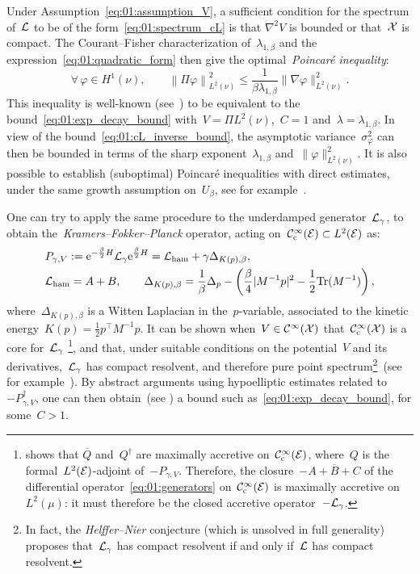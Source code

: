Under Assumption~\eqref{eq:01:assumption_V}, a sufficient condition for the spectrum of~$\mathcal{L}$ to be of the form~\eqref{eq:01:spectrum_cL} is that $\nabla^2 V$ is bounded or that~$\mathcal{X}$ is compact. The Courant--Fisher characterization of~$\lambda_{1,\beta}$ and the expression~\eqref{eq:01:quadratic_form} then give the optimal~\textit{Poincar\'e inequality}:
\begin{equation}
    \label{eq:01:poincare_inequality}
    \forall\,\varphi\in H^1(\nu),\qquad\left\|\Pi\varphi\right\|^2_{L^2(\nu)}\leq \frac1{\beta \lambda_{1,\beta}}\|\nabla\varphi\|^2_{L^2(\nu)}.
\end{equation}  
This inequality is well-known (see~\cite[Proposition 2.3]{LS16}) to be equivalent to the bound~\eqref{eq:01:exp_decay_bound} with~$V=\Pi L^2(\nu)$,~$C=1$ and~$\lambda = \lambda_{1,\beta}$.
In view of the bound~\eqref{eq:01:cL_inverse_bound}, the asymptotic variance~$\sigma_\varphi^2$ can then be bounded in terms of the sharp exponent~$\lambda_{1,\beta}$ and~$\|\varphi\|^2_{L^2(\nu)}$.
It is also possible to establish (suboptimal) Poincar\'e inequalities with direct estimates, under the same growth assumption on~$U_\beta$, see for example~\cite[Theorem A.1]{V06}.

One can try to apply the same procedure to the underdamped generator~$\mathcal{L}_\gamma$, to obtain the~\textit{Kramers--Fokker--Planck} operator, acting on~$\mathcal{C}^\infty_{\mathrm{c}}(\mathcal{E})\subset L^2(\mathcal{E})$ as:
\begin{equation}
    \label{eq:01:kfp}
    \begin{split}
    &P_{\gamma,V}:=\mathrm{e}^{-\frac{\beta}2 H}\mathcal{L}_\gamma\mathrm{e}^{\frac{\beta}2 H} = \mathcal{L}_{\mathrm{ham}} + \gamma\Delta_{K(p),\beta},\\
    &\mathcal{L}_{\mathrm{ham}}=A+B,\qquad\Delta_{K(p),\beta} = \frac1\beta\Delta_p -\left(\frac\beta{4}|M^{-1}p|^2 -\frac12 \mathrm{Tr}(M^{-1})\right),
    \end{split}
\end{equation}
where~$\Delta_{K(p),\beta}$ is a Witten Laplacian in the~$p$-variable, associated to the kinetic energy~$K(p)=\frac12 p^\top M^{-1}p$.
It can be shown when~$V\in \mathcal C^\infty(\mathcal{X})$ that~$\mathcal{C}^\infty_{\mathrm{c}}(\mathcal{X})$ is a core for~$\mathcal{L}_\gamma$
\footnote{\cite[Proposition 5.5]{NH05} shows that $\overline{Q}$ and~$Q^\dagger$ are maximally accretive on~$\mathcal{C}^\infty_{\mathrm{c}}(\mathcal{E})$, where~$Q$ is the formal~$L^2(\mathcal{E})$-adjoint of~$-P_{\gamma,V}$. Therefore, the closure~$-\overline{A+B+C}$ of the differential operator~\eqref{eq:01:generators} on~$\mathcal{C}^\infty_{\mathrm{c}}(\mathcal{E})$ is maximally accretive on~$L^2(\mu)$: it must therefore be the closed accretive operator~$-\mathcal{L}_\gamma$.},
and that, under suitable conditions on the potential~$V$ and its derivatives,~$\mathcal{L}_\gamma$ has compact resolvent, and therefore pure point spectrum\footnote{In fact, the \textit{Helffer--Nier} conjecture (which is unsolved in full generality) proposes that~$\mathcal{L}_{\gamma}$ has compact resolvent if and only if~$\mathcal{L}$ has compact resolvent.}~(see for example~\cite[Corollary 5.10]{NH05}).
By abstract arguments using hypoelliptic estimates related to~$-P_{\gamma,V}^\dagger$, one can then obtain~(see \cite[Theorem 6.4]{NH05}) a bound such as~\eqref{eq:01:exp_decay_bound}, for some~$C>1$.

